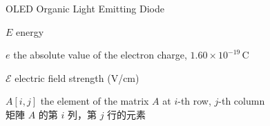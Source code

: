 %
\begin{SymEntry}

\item[OLED]
Organic Light Emitting Diode

\item[$E$]
energy

\item[$e$]
the absolute value of the electron charge, $1.60\times10^{-19}\,\text{C}$
 
\item[$\mathscr{E}$]
electric field strength (V/cm)

\item[{$A[i,j]$}]
the  element of the matrix $A$ at $i$-th row, $j$-th column\\
矩陣 $A$ 的第 $i$ 列，第 $j$ 行的元素

\end{SymEntry}